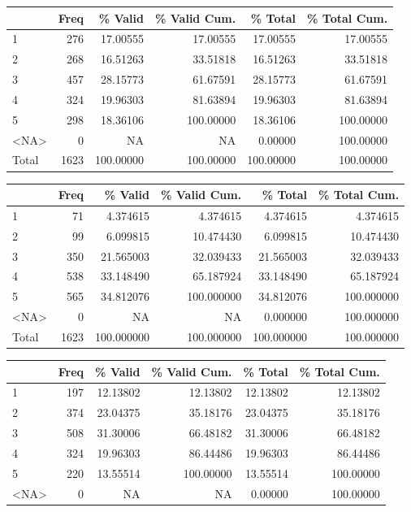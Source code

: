 \documentclass[
  letterpaper,
  DIV=11,
  numbers=noendperiod]{scrartcl}
\begin{document}
\begin{table}
\begin{tabular}[t]{l|r|r|r|r|r}
\hline
  & Freq & \% Valid & \% Valid Cum. & \% Total & \% Total Cum.\\
\hline
1 & 276 & 17.00555 & 17.00555 & 17.00555 & 17.00555\\
\hline
2 & 268 & 16.51263 & 33.51818 & 16.51263 & 33.51818\\
\hline
3 & 457 & 28.15773 & 61.67591 & 28.15773 & 61.67591\\
\hline
4 & 324 & 19.96303 & 81.63894 & 19.96303 & 81.63894\\
\hline
5 & 298 & 18.36106 & 100.00000 & 18.36106 & 100.00000\\
\hline
<NA> & 0 & NA & NA & 0.00000 & 100.00000\\
\hline
Total & 1623 & 100.00000 & 100.00000 & 100.00000 & 100.00000\\
\hline
\end{tabular}
\centering
\begin{tabular}[t]{l|r|r|r|r|r}
\hline
  & Freq & \% Valid & \% Valid Cum. & \% Total & \% Total Cum.\\
\hline
1 & 71 & 4.374615 & 4.374615 & 4.374615 & 4.374615\\
\hline
2 & 99 & 6.099815 & 10.474430 & 6.099815 & 10.474430\\
\hline
3 & 350 & 21.565003 & 32.039433 & 21.565003 & 32.039433\\
\hline
4 & 538 & 33.148490 & 65.187924 & 33.148490 & 65.187924\\
\hline
5 & 565 & 34.812076 & 100.000000 & 34.812076 & 100.000000\\
\hline
<NA> & 0 & NA & NA & 0.000000 & 100.000000\\
\hline
Total & 1623 & 100.000000 & 100.000000 & 100.000000 & 100.000000\\
\hline
\end{tabular}
\centering
\begin{tabular}[t]{l|r|r|r|r|r}
\hline
  & Freq & \% Valid & \% Valid Cum. & \% Total & \% Total Cum.\\
\hline
1 & 197 & 12.13802 & 12.13802 & 12.13802 & 12.13802\\
\hline
2 & 374 & 23.04375 & 35.18176 & 23.04375 & 35.18176\\
\hline
3 & 508 & 31.30006 & 66.48182 & 31.30006 & 66.48182\\
\hline
4 & 324 & 19.96303 & 86.44486 & 19.96303 & 86.44486\\
\hline
5 & 220 & 13.55514 & 100.00000 & 13.55514 & 100.00000\\
\hline
<NA> & 0 & NA & NA & 0.00000 & 100.00000\\

\end{tabular}
\end{table}
\end{document}
